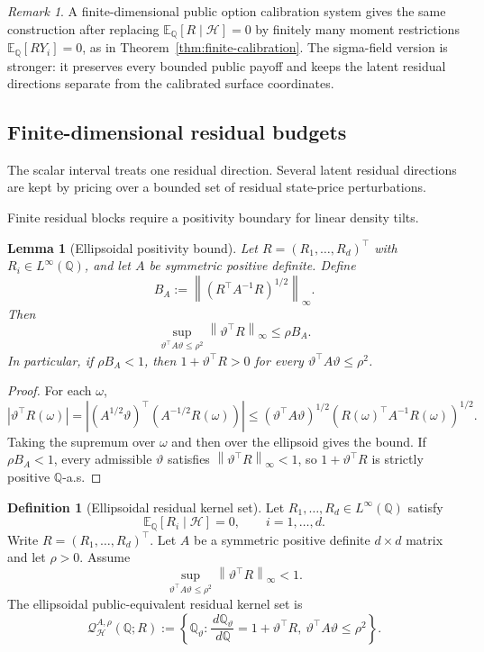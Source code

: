 \documentclass[11pt,a4paper]{amsart}
\theoremstyle{plain}
\newtheorem{lemma}[theorem]{Lemma}
\theoremstyle{definition}
\newtheorem{definition}[theorem]{Definition}
\theoremstyle{remark}
\newtheorem{remark}[theorem]{Remark}
\newcommand{\QQ}{\mathbb{Q}}
\newcommand{\EE}{\mathbb{E}}
\newcommand{\cH}{\mathcal{H}}
\newcommand{\cQ}{\mathcal{Q}}
\newcommand{\dd}{\,d}
\newcommand{\norm}[1]{\left\lVert #1\right\rVert}
\begin{document}
\begin{remark}
A finite-dimensional public option calibration system gives the same construction after replacing
\(\EE_\QQ[R\mid\cH]=0\) by finitely many moment restrictions
\(\EE_\QQ[R Y_i]=0\), as in Theorem~\ref{thm:finite-calibration}.  The sigma-field version is
stronger: it preserves every bounded public payoff and keeps the latent residual directions
separate from the calibrated surface coordinates.
\end{remark}

\subsection{Finite-dimensional residual budgets}

The scalar interval treats one residual direction.  Several latent residual directions are kept by
pricing over a bounded set of residual state-price perturbations.

Finite residual blocks require a positivity boundary for linear density tilts.

\begin{lemma}[Ellipsoidal positivity bound]\label{lem:ellipsoidal-positivity}
Let \(R=(R_1,\ldots,R_d)^\top\) with \(R_i\in L^\infty(\QQ)\), and let \(A\) be symmetric positive
definite.  Define
\[
        B_A
        :=
        \norm{(R^\top A^{-1}R)^{1/2}}_\infty.
\]
Then
\[
        \sup_{\vartheta^\top A\vartheta\le\rho^2}
        \norm{\vartheta^\top R}_\infty
        \le
        \rho B_A.
\]
In particular, if \(\rho B_A<1\), then \(1+\vartheta^\top R>0\) for every
\(\vartheta^\top A\vartheta\le\rho^2\).
\end{lemma}

\begin{proof}
For each \(\omega\),
\[
        |\vartheta^\top R(\omega)|
        =
        |(A^{1/2}\vartheta)^\top(A^{-1/2}R(\omega))|
        \le
        (\vartheta^\top A\vartheta)^{1/2}(R(\omega)^\top A^{-1}R(\omega))^{1/2}.
\]
Taking the supremum over \(\omega\) and then over the ellipsoid gives the bound.  If
\(\rho B_A<1\), every admissible \(\vartheta\) satisfies
\(\norm{\vartheta^\top R}_\infty<1\), so \(1+\vartheta^\top R\) is strictly positive
\(\QQ\)-a.s.
\end{proof}

\begin{definition}[Ellipsoidal residual kernel set]\label{def:ellipsoidal-residual-set}
Let \(R_1,\ldots,R_d\in L^\infty(\QQ)\) satisfy
\[
        \EE_\QQ[R_i\mid\cH]=0,
        \qquad i=1,\ldots,d.
\]
Write \(R=(R_1,\ldots,R_d)^\top\).  Let \(A\) be a symmetric positive definite \(d\times d\)
matrix and let \(\rho>0\).  Assume
\[
        \sup_{\vartheta^\top A\vartheta\le \rho^2}
        \norm{\vartheta^\top R}_{\infty}
        <
        1.
\]
The ellipsoidal public-equivalent residual kernel set is
\[
        \cQ_{\cH}^{A,\rho}(\QQ;R)
        :=
        \left\{
        \QQ_\vartheta:
        \frac{\dd\QQ_\vartheta}{\dd\QQ}=1+\vartheta^\top R,\ 
        \vartheta^\top A\vartheta\le\rho^2
        \right\}.
\]
\end{definition}
\end{document}
